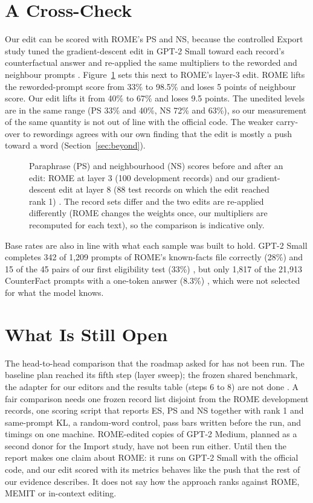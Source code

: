 \section{A Cross-Check}\label{sec:rome-cross}

Our edit can be scored with ROME's PS and NS, because the controlled Export study tuned the gradient-descent edit in GPT-2 Small toward each record's counterfactual answer and re-applied the same multipliers to the reworded and neighbour prompts \cite{p16}. Figure~\ref{fig:rome-vs-ours} sets this next to ROME's layer-3 edit. ROME lifts the reworded-prompt score from 33\% to 98.5\% and loses 5 points of neighbour score. Our edit lifts it from 40\% to 67\% and loses 9.5 points. The unedited levels are in the same range (PS 33\% and 40\%, NS 72\% and 63\%), so our measurement of the same quantity is not out of line with the official code. The weaker carry-over to rewordings agrees with our own finding that the edit is mostly a push toward a word (Section~\ref{sec:beyond}).

\begin{figure}[!htb]
\centering
{}
\caption{Paraphrase (PS) and neighbourhood (NS) scores before and after an edit: ROME at layer 3 (100 development records) and our gradient-descent edit at layer 8 (88 test records on which the edit reached rank 1) \cite{p15,p16}. The record sets differ and the two edits are re-applied differently (ROME changes the weights once, our multipliers are recomputed for each text), so the comparison is indicative only.}\label{fig:rome-vs-ours}
\end{figure}

Base rates are also in line with what each sample was built to hold. GPT-2 Small completes 342 of 1,209 prompts of ROME's known-facts file correctly (28\%) \cite{p15} and 15 of the 45 pairs of our first eligibility test (33\%) \cite{p1}, but only 1,817 of the 21,913 CounterFact prompts with a one-token answer (8.3\%) \cite{p10}, which were not selected for what the model knows.

\section{What Is Still Open}\label{sec:rome-open}

The head-to-head comparison that the roadmap asked for has not been run. The baseline plan reached its fifth step (layer sweep); the frozen shared benchmark, the adapter for our editors and the results table (steps 6 to 8) are not done \cite{p15,p19}. A fair comparison needs one frozen record list disjoint from the ROME development records, one scoring script that reports ES, PS and NS together with rank 1 and same-prompt KL, a random-word control, pass bars written before the run, and timings on one machine. ROME-edited copies of GPT-2 Medium, planned as a second donor for the Import study, have not been run either. Until then the report makes one claim about ROME: it runs on GPT-2 Small with the official code, and our edit scored with its metrics behaves like the push that the rest of our evidence describes. It does not say how the approach ranks against ROME, MEMIT or in-context editing.

